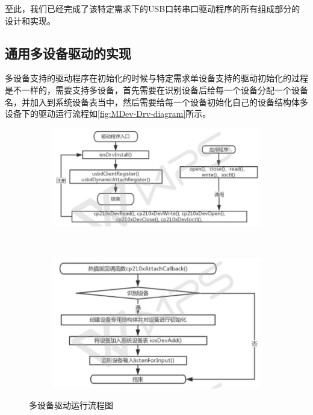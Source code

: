 至此，我们已经完成了该特定需求下的USB口转串口驱动程序的所有组成部分的设计和实现。

\subsection{通用多设备驱动的实现}
多设备支持的驱动程序在初始化的时候与特定需求单设备支持的驱动初始化的过程是不一样的，需要支持多设备，首先需要在识别设备后给每一个设备分配一个设备名，并加入到系统设备表当中，然后需要给每一个设备初始化自己的设备结构体多设备下的驱动运行流程如\autoref{fig:MDev-Drv-diagram}所示。

\begin{figure}[p, !h]
\centering
  \begin{subfigure}[b]{1.0\textwidth}
  \includegraphics[width=\textwidth]{./graphics/MDev-Drv-Diagram-a.pdf}
  \caption{}\label{fig:MDevice-Driver-diagram-a}
  \end{subfigure}
  ~
  \begin{subfigure}[b]{1.0\textwidth}
  \includegraphics[width=\textwidth]{./graphics/MDev-Drv-Diagram-b.pdf}
  \caption{}\label{fig:MDevice-Driver-diagram-b}
  \end{subfigure}
\caption{多设备驱动运行流程图}\label{fig:MDev-Drv-diagram}
\end{figure}


